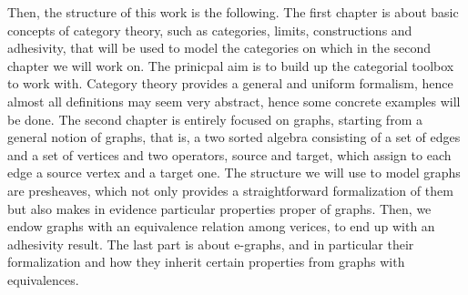 Then, the structure of this work is the following.
The first chapter is about basic concepts of category theory, such as categories, limits, constructions and adhesivity, that will be used to model the categories on which in the second chapter we will work on.
The prinicpal aim is to build up the categorial toolbox to work with. Category theory provides a general and uniform formalism, hence almost all definitions may seem very abstract, hence some concrete examples will be done.
The second chapter is entirely focused on graphs, starting from a general notion of graphs, that is, a two sorted algebra consisting of a set of edges and a set of vertices and two operators, source and target, which assign to each edge a source vertex and a target one.
The structure we will use to model graphs are presheaves, which not only provides a straightforward formalization of them but also makes in evidence particular properties proper of graphs.
Then, we endow graphs with an equivalence relation among verices, to end up with an adhesivity result.
The last part is about e-graphs, and in particular their formalization and how they inherit certain properties from graphs with equivalences.


